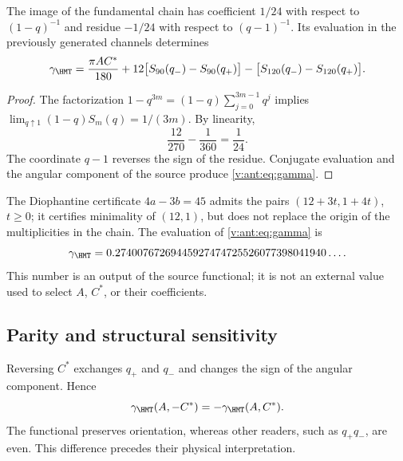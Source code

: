 \begin{theorem}
The image of the fundamental chain has coefficient $1/24$
with respect to $(1-q)^{-1}$ and residue $-1/24$ with respect to $(q-1)^{-1}$.
Its evaluation in the previously generated channels determines
\begin{equation}
\gamma_{\HMT}=
\frac{\pi AC^*}{180}
+12\bigl[S_{90}(q_-)-S_{90}(q_+)\bigr]
-\bigl[S_{120}(q_-)-S_{120}(q_+)\bigr].
\label{v:ant:eq:gamma}
\end{equation}
\end{theorem}
\begin{proof}
The factorization $1-q^{3m}=(1-q)\sum_{j=0}^{3m-1}q^j$ implies
$\lim_{q\uparrow1}(1-q)S_m(q)=1/(3m)$. By linearity,
\[
\frac{12}{270}-\frac1{360}=\frac1{24}.
\]
The coordinate $q-1$ reverses the sign of the residue.
Conjugate evaluation and the angular component of the source
produce \eqref{v:ant:eq:gamma}.
\end{proof}

The Diophantine certificate $4a-3b=45$ admits the pairs
$(12+3t,1+4t)$, $t\ge0$; it certifies minimality of $(12,1)$,
but does not replace the origin of the multiplicities in the chain.
The evaluation of \eqref{v:ant:eq:gamma} is
\[
\gamma_{\HMT}
=0.27400767269445927474725526077398041940\ldots.
\]
This number is an output of the source functional; it is not an external value
used to select $A$, $C^*$, or their coefficients.

\subsection{Parity and structural sensitivity}
Reversing $C^*$ exchanges $q_+$ and $q_-$ and changes the sign
of the angular component. Hence
\[
\gamma_{\HMT}(A,-C^*)=-\gamma_{\HMT}(A,C^*).
\]
The functional preserves orientation, whereas other readers,
such as $q_+q_-$, are even. This difference precedes their physical interpretation.
